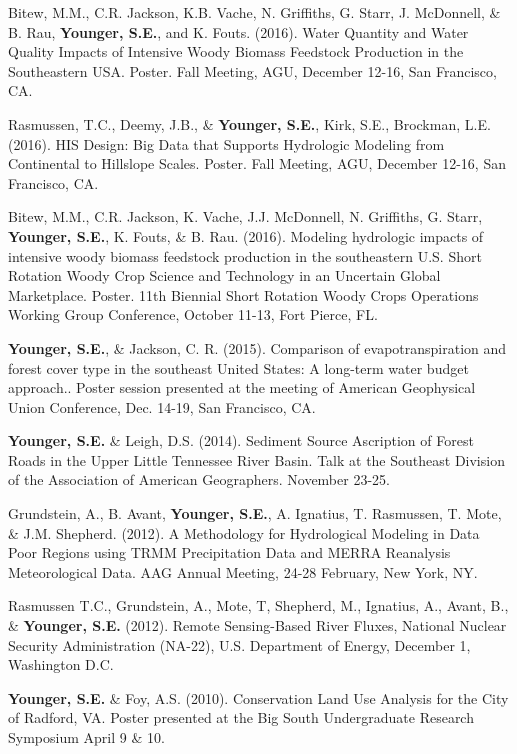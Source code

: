 \documentclass[10pt,letterpaper]{article}
\begin{document}
\begin{hangparas}{.25in}{1}
		Bitew, M.M., C.R. Jackson, K.B. Vache, N. Griffiths, G. Starr, J. McDonnell, \& B. Rau, \textbf{Younger, S.E.}, and K. Fouts. (2016). Water Quantity and Water Quality Impacts of Intensive Woody Biomass Feedstock Production in the Southeastern USA. Poster. Fall Meeting, AGU, December 12-16, San Francisco, CA. 
		
		Rasmussen, T.C., Deemy, J.B., \& \textbf{Younger, S.E.}, Kirk, S.E., Brockman, L.E. (2016). HIS Design: Big Data that Supports Hydrologic Modeling from Continental to Hillslope Scales. Poster. Fall Meeting, AGU, December 12-16, San Francisco, CA. 
		
		Bitew, M.M., C.R. Jackson, K. Vache, J.J. McDonnell, N. Griffiths, G. Starr, \textbf{Younger, S.E.}, K. Fouts, \& B. Rau. (2016). Modeling hydrologic impacts of intensive woody biomass feedstock production in the southeastern U.S. Short Rotation Woody Crop Science and Technology in an Uncertain Global Marketplace. Poster. 11th Biennial Short Rotation Woody Crops Operations Working Group Conference, October 11-13, Fort Pierce, FL.
		
		\textbf{Younger, S.E.}, \& Jackson, C. R. (2015). Comparison of evapotranspiration and forest cover type in the southeast United States: A long-term water budget approach.. Poster session presented at the meeting of American Geophysical Union Conference, Dec. 14-19, San Francisco, CA.
		
		\textbf{Younger, S.E.} \& Leigh, D.S. (2014). Sediment Source Ascription of Forest Roads in the Upper Little Tennessee River Basin. Talk at the Southeast Division of the Association of American Geographers. November 23-25.
		
		Grundstein, A., B. Avant, \textbf{Younger, S.E.}, A. Ignatius, T. Rasmussen, T. Mote, \& J.M. Shepherd. (2012). A Methodology for Hydrological Modeling in Data Poor Regions using TRMM Precipitation Data and MERRA Reanalysis Meteorological Data. AAG Annual Meeting, 24-28 February, New York, NY.
		
		Rasmussen T.C., Grundstein, A., Mote, T, Shepherd, M., Ignatius, A., Avant, B., \& \textbf{Younger, S.E.} (2012). Remote Sensing-Based River Fluxes, National Nuclear Security Administration (NA-22), U.S. Department of Energy, December 1, Washington D.C.
		
		\textbf{Younger, S.E.} \& Foy, A.S. (2010). Conservation Land Use Analysis for the City of Radford, VA. Poster presented at the Big South Undergraduate Research Symposium April 9 \& 10.
		
	\end{hangparas}
	
\end{document}
